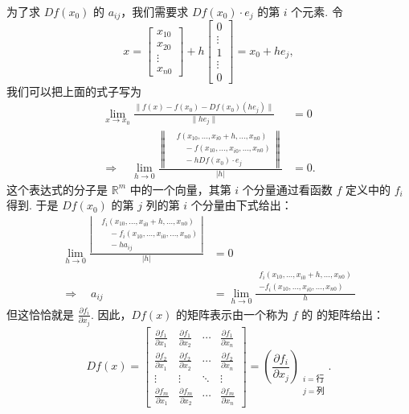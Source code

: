 为了求 $Df(x_0)$ 的 $a_{ij}$，我们需要求 $Df(x_0)\cdot e_j$ 的第 $i$ 个元素. 令
\[
x=\begin{bmatrix}x_{10}\\x_{20}\\\vdots\\x_{n0}\end{bmatrix}+h\begin{bmatrix}0\\\vdots\\1\\\vdots\\0\end{bmatrix}=x_0+he_j,
\]
我们可以把上面的式子写为
\begin{align*}
\lim_{x\to x_0}\frac{\|f(x)-f(x_0)-Df(x_0)(he_j)\|}{\|he_j\|}&=0\\
\Rightarrow\quad\lim_{h\to0}\frac{\left\|\begin{aligned}
&f(x_{10},\ldots,x_{i0}+h,\ldots,x_{n0})\\
&\quad-f(x_{10},\ldots,x_{i0},\ldots,x_{n0})\\
&\quad-hDf(x_0)\cdot e_j
\end{aligned}\right\|}{|h|}&=0.
\end{align*}
这个表达式的分子是 $\mathbb{R}^m$ 中的一个向量，其第 $i$ 个分量通过看函数 $f$ 定义中的 $f_i$ 得到. 于是 $Df(x_0)$ 的第 $j$ 列的第 $i$ 个分量由下式给出：
\begin{align*}
\lim_{h\to0}\frac{\left|\begin{aligned}
&f_i(x_{10},\ldots,x_{i0}+h,\ldots,x_{n0})\\
&\quad-f_i(x_{10},\ldots,x_{i0},\ldots,x_{n0})\\
&\quad-ha_{ij}
\end{aligned}\right|}{|h|}&=0\\
\Rightarrow\quad a_{ij}&=\lim_{h\to0}\frac{\begin{aligned}
f_i(x_{10},\ldots,x_{i0}+h,\ldots,x_{n0})\\
-f_i(x_{10},\ldots,x_{i0},\ldots,x_{n0})
\end{aligned}}{h}
\end{align*}
但这恰恰就是 $\frac{\partial f_i}{\partial x_j}$. 因此，$Df(x)$ 的矩阵表示由一个称为 $f$ 的  的矩阵给出：
\[
Df(x)=\begin{bmatrix}
\frac{\partial f_1}{\partial x_1}&\frac{\partial f_1}{\partial x_2}&\cdots&\frac{\partial f_1}{\partial x_n}\\[2mm]
\frac{\partial f_2}{\partial x_1}&\frac{\partial f_2}{\partial x_2}&\cdots&\frac{\partial f_2}{\partial x_n}\\
\vdots&\vdots&\ddots&\vdots\\
\frac{\partial f_m}{\partial x_1}&\frac{\partial f_m}{\partial x_2}&\cdots&\frac{\partial f_m}{\partial x_n}
\end{bmatrix}
=\left(\frac{\partial f_i}{\partial x_j}\right)_{\substack{i=\text{行}\\j=\text{列}}}.
\]

